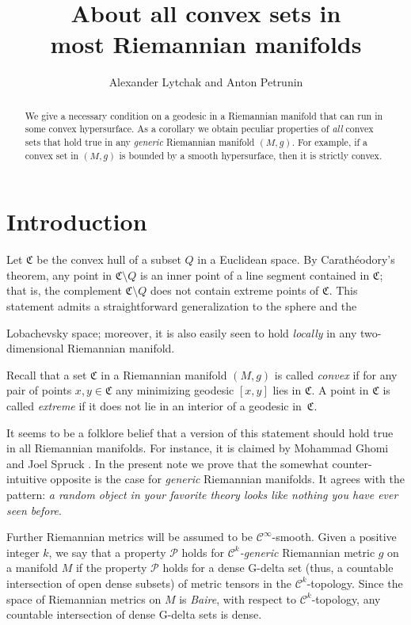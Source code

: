\documentclass[a4paper,10pt]{article}
\def\thetitle{About all convex sets in\\ most Riemannian manifolds}
\begin{document}
\title{\thetitle}
\author{Alexander Lytchak and Anton Petrunin}
\date{}
\maketitle

\begin{abstract}
We give a necessary condition on a geodesic in a Riemannian manifold that can run in some convex hypersurface.
As a corollary we obtain peculiar properties of \emph{all} convex sets that hold true in any \emph{generic} Riemannian manifold $(M,g)$.
For example, if a convex set in $(M,g)$ is bounded by a smooth hypersurface, then it is strictly convex.
\end{abstract}

\section{Introduction}
Let $\mathfrak{C}$ be the convex hull of a subset $Q$ in a Euclidean space.
By Carathéodory's theorem, any point in $\mathfrak{C}\setminus Q$ is an inner point of a line segment contained in $\mathfrak{C}$;
that is, the complement $\mathfrak{C} \setminus Q$ does not contain extreme points of $\mathfrak{C}$.
This statement admits a straightforward generalization to the sphere and the {\color{red} Lobachevsky space; moreover, it  is also easily seen to hold \emph{locally} in any two-dimensional Riemannian manifold.

Recall that a set $\mathfrak{C}$ in a Riemannian manifold $(M,g)$ is called \emph{convex} if for any pair of points $x,y\in \mathfrak{C}$ any minimizing geodesic $[x,y]$ lies in $\mathfrak{C}$.
A point in $\mathfrak{C}$ is called \emph{extreme} if it does not lie in an interior of a geodesic in~$\mathfrak{C}$.}

It seems to be a folklore belief that a version of this statement should hold true in all Riemannian manifolds.
For instance, it is claimed by Mohammad Ghomi and Joel Spruck \cite[Lemma 9.1]{Ghomi}.
In the present note we prove that the somewhat counter-intuitive opposite is the case for \emph{generic} Riemannian manifolds.
It agrees with the pattern: \emph{a random object in your favorite theory  looks like nothing you have ever seen before}.

Further Riemannian metrics will be assumed to be $\mathcal C^\infty$-smooth.
Given a positive integer $k$, we say that a property $\mathcal P$ holds for \emph{$\mathcal C^k$-generic} Riemannian metric $g$ on a manifold $M$ 
if the property $\mathcal P$ holds for a dense G-delta set  {\color{red}(thus, a countable intersection of open dense subsets)} of metric tensors in the $\mathcal C^k$-topology.
Since the space of Riemannian metrics  on $M$ is \emph{Baire}, {\color{red} with  respect to $\mathcal C^k$-topology, any 
countable intersection of dense G-delta sets} is dense.
\end{document}
